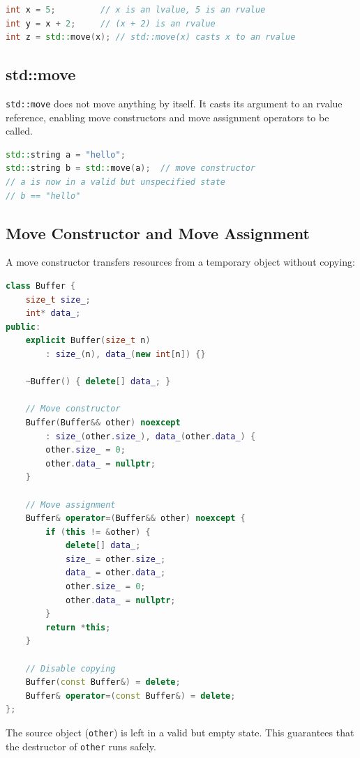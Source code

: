 \begin{lstlisting}[language=C++]
int x = 5;         // x is an lvalue, 5 is an rvalue
int y = x + 2;     // (x + 2) is an rvalue
int z = std::move(x); // std::move(x) casts x to an rvalue
\end{lstlisting}

\subsection{std::move}

\texttt{std::move} does not move anything by itself. It casts its argument to an rvalue reference, enabling move constructors and move assignment operators to be called.

\begin{lstlisting}[language=C++]
std::string a = "hello";
std::string b = std::move(a);  // move constructor
// a is now in a valid but unspecified state
// b == "hello"
\end{lstlisting}

\subsection{Move Constructor and Move Assignment}

A move constructor transfers resources from a temporary object without copying:

\begin{lstlisting}[language=C++]
class Buffer {
    size_t size_;
    int* data_;
public:
    explicit Buffer(size_t n)
        : size_(n), data_(new int[n]) {}

    ~Buffer() { delete[] data_; }

    // Move constructor
    Buffer(Buffer&& other) noexcept
        : size_(other.size_), data_(other.data_) {
        other.size_ = 0;
        other.data_ = nullptr;
    }

    // Move assignment
    Buffer& operator=(Buffer&& other) noexcept {
        if (this != &other) {
            delete[] data_;
            size_ = other.size_;
            data_ = other.data_;
            other.size_ = 0;
            other.data_ = nullptr;
        }
        return *this;
    }

    // Disable copying
    Buffer(const Buffer&) = delete;
    Buffer& operator=(const Buffer&) = delete;
};
\end{lstlisting}

The source object (\texttt{other}) is left in a valid but empty state. This guarantees that the destructor of \texttt{other} runs safely.

